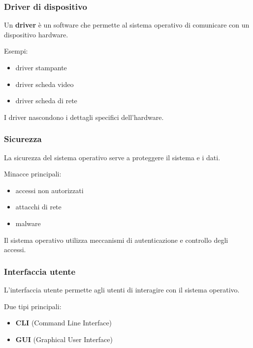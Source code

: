 \documentclass{beamer}
\begin{document}

\begin{frame}
	\frametitle{Driver di dispositivo}
	
	Un \textbf{driver} è un software che permette
	al sistema operativo di comunicare con
	un dispositivo hardware.
	
	Esempi:
	
	\begin{itemize}
		\item driver stampante
		\item driver scheda video
		\item driver scheda di rete
	\end{itemize}
	
	I driver nascondono i dettagli specifici
	dell'hardware.
	
\end{frame}


\begin{frame}
	\frametitle{Sicurezza}
	
	La sicurezza del sistema operativo serve
	a proteggere il sistema e i dati.
	
	Minacce principali:
	
	\begin{itemize}
		\item accessi non autorizzati
		\item attacchi di rete
		\item malware
	\end{itemize}
	
	Il sistema operativo utilizza meccanismi
	di autenticazione e controllo degli accessi.
	
\end{frame}


\begin{frame}
	\frametitle{Interfaccia utente}
	
	L'interfaccia utente permette agli utenti
	di interagire con il sistema operativo.
	
	Due tipi principali:
	
	\begin{itemize}
		\item \textbf{CLI} (Command Line Interface)
		\item \textbf{GUI} (Graphical User Interface)
	\end{itemize}
	
\end{frame}
\end{document}
